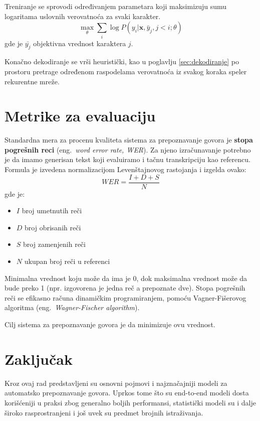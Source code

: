 \documentclass[a4paper]{article}
\begin{document}
Treniranje se sprovodi određivanjem parametara koji maksimizuju sumu logaritama uslovnih verovatnoća za svaki karakter.
\begin{equation}
  \label{eq:max}
  \max_{\theta} \sum_i \log P(y_i | \textbf{x}, \bar{y}_j, j < i; \theta)
\end{equation}
gde je $\bar{y_j}$ objektivna vrednost karaktera $j$.

Konačno dekodiranje se vrši heuristički, kao u poglavlju \ref{sec:dekodiranje} po prostoru pretrage određenom raspodelama verovatnoća iz svakog koraka speler rekurentne mreže.

\section{Metrike za evaluaciju}
Standardna mera za procenu kvaliteta sistema za prepoznavanje govora je \textbf{stopa pogrešnih reci} (eng.~{\em word error rate, WER}).
Za njeno izračunavanje potrebno je da imamo generisan tekst koji evaluiramo i tačnu transkripciju kao referencu.
Formula je izvedena normalizacijom Levenštajnovog rastojanja i izgelda ovako:
\begin{equation*}
  WER = \frac{I + D + S}{N}
\end{equation*}
gde je:
\begin{itemize}
  \item $I$ broj umetnutih reči
  \item $D$ broj obrisanih reči
  \item $S$ broj zamenjenih reči
  \item $N$ ukupan broj reči u referenci
\end{itemize}
Minimalna vrednost koju može da ima je 0, dok maksimalna vrednost može da bude preko 1 (npr. izgovorena je jedna reč a prepoznate dve).
Stopa pogrešnih reči se efikasno računa dinamičkim programiranjem, pomoću Vagner-Fišerovog algoritma (eng.~{\em Wagner-Fischer algorithm}). %

Cilj sistema za prepoznavanje govora je da minimizuje ovu vrednost.

\section{Zaključak}
\label{sec:zakljucak}

Kroz ovaj rad predstavljeni su osnovni pojmovi i najznačajniji modeli za automatsko prepoznavanje govora.
Uprkos tome što su end-to-end modeli dosta korišćeniji u praksi zbog generalno boljih performansi, statistički modeli su i dalje široko rasprostranjeni i još uvek su predmet brojnih istraživanja.
\end{document}

